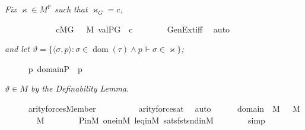 \textit{Fix $\varkappa \in M^{\mathbb{P}}$ such that
  $\varkappa_{G}=c$,}
\begin{isabelle}
\ \ \ \ \isamarkupfalse%
\isanewline
\ \ \ \ \isamarkupfalse%
\ {\isasymchi}\ \ {\isachardoublequoteopen}c{\isasymin}M{\isacharbrackleft}{\kern0pt}G{\isacharbrackright}{\kern0pt}{\isachardoublequoteclose}\ {\isachardoublequoteopen}{\isasymchi}\ {\isasymin}\ M{\isachardoublequoteclose}\ {\isachardoublequoteopen}val{\isacharparenleft}{\kern0pt}P{\isacharcomma}{\kern0pt}G{\isacharcomma}{\kern0pt}{\isasymchi}{\isacharparenright}{\kern0pt}\ {\isacharequal}{\kern0pt}\ c{\isachardoublequoteclose}\isanewline
\ \ \ \ \ \ \isamarkupfalse%
\ GenExt{\isacharunderscore}{\kern0pt}iff\ \isamarkupfalse%
\ auto
\end{isabelle}
\textit{and let $\vartheta=\{\langle\sigma, p\rangle:
  \sigma \in \operatorname{dom}(\tau) \wedge p \Vdash \sigma \in
  \varkappa\}$;}
\begin{isabelle}
\ \ \ \ \isamarkupfalse%
\ {\isacharquery}{\kern0pt}{\isasymtheta}{\isacharequal}{\kern0pt}{\isachardoublequoteopen}{\isacharbraceleft}{\kern0pt}{\isasymlangle}{\isasymsigma}{\isacharcomma}{\kern0pt}p{\isasymrangle}\ {\isasymin}domain{\isacharparenleft}{\kern0pt}{\isasymtau}{\isacharparenright}{\kern0pt}{\isasymtimes}P\ {\isachardot}{\kern0pt}\ p\ {\isasymtturnstile}\ {\isasymcdot}{}\ {\isasymin}\ {}{\isasymcdot}\ {\isacharbrackleft}{\kern0pt}{\isasymsigma}{\isacharcomma}{\kern0pt}{\isasymchi}{\isacharbrackright}{\kern0pt}\ {\isacharbraceright}{\kern0pt}{\isachardoublequoteclose}
\end{isabelle}
\textit{$\vartheta \in M$ by the Definability Lemma.}
\begin{isabelle}
\ \ \ \ \isamarkupfalse%
\ {\isachardoublequoteopen}arity{\isacharparenleft}{\kern0pt}forces{\isacharparenleft}{\kern0pt}Member{\isacharparenleft}{\kern0pt}{}{\isacharcomma}{\kern0pt}{}{\isacharparenright}{\kern0pt}{\isacharparenright}{\kern0pt}{\isacharparenright}{\kern0pt}\ {\isacharequal}{\kern0pt}\ {}{\isachardoublequoteclose}\isanewline
\ \ \ \ \ \ \isamarkupfalse%
\ arity{\isacharunderscore}{\kern0pt}forces{\isacharunderscore}{\kern0pt}at\ \isamarkupfalse%
\ auto\isanewline
\ \ \ \ \isamarkupfalse%
\ {\isacartoucheopen}domain{\isacharparenleft}{\kern0pt}{\isasymtau}{\isacharparenright}{\kern0pt}\ {\isasymin}\ M{\isacartoucheclose}\ {\isacartoucheopen}{\isasymchi}\ {\isasymin}\ M{\isacartoucheclose}\isanewline
\ \ \ \ \isamarkupfalse%
\ {\isachardoublequoteopen}{\isacharquery}{\kern0pt}{\isasymtheta}\ {\isasymin}\ M{\isachardoublequoteclose}\isanewline
\ \ \ \ \ \ \isamarkupfalse%
\ P{\isacharunderscore}{\kern0pt}in{\isacharunderscore}{\kern0pt}M\ one{\isacharunderscore}{\kern0pt}in{\isacharunderscore}{\kern0pt}M\ leq{\isacharunderscore}{\kern0pt}in{\isacharunderscore}{\kern0pt}M\ sats{\isacharunderscore}{\kern0pt}fst{\isacharunderscore}{\kern0pt}snd{\isacharunderscore}{\kern0pt}in{\isacharunderscore}{\kern0pt}M\isanewline
\ \ \ \ \ \ \isamarkupfalse%
\ simp
\end{isabelle}

